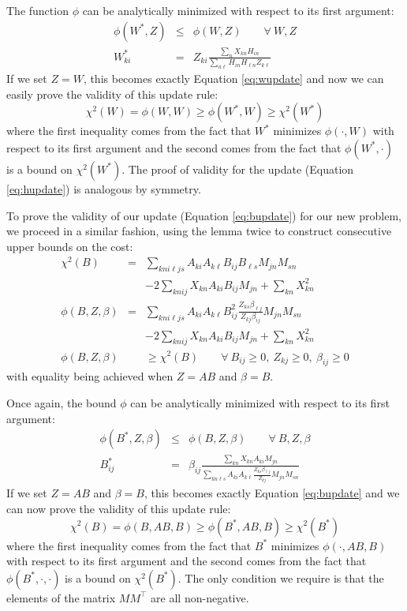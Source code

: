 \documentclass[12pt,preprint]{aastex}
\newcommand{\T}{^{\scriptscriptstyle \top}}
\newcommand{\Xkn}{X_{kn}}
\renewcommand{\AA}{A}
\newcommand{\WW}{W}
\newcommand{\Wki}{W_{ki}}
\newcommand{\Hin}{H_{in}}
\newcommand{\Hln}{H_{\ell{}n}}
\newcommand{\BB}{B}
\newcommand{\MM}{M}
\newcommand{\Aki}{A_{ki}}
\newcommand{\Akl}{A_{k\ell}}
\newcommand{\Bij}{B_{ij}}
\newcommand{\Bls}{B_{\ell{}s}}
\newcommand{\Mjn}{M_{jn}}
\newcommand{\Msn}{M_{sn}}
\newcommand{\ZZ}{Z}
\newcommand{\Zki}{Z_{ki}}
\newcommand{\Zkl}{Z_{k\ell}}
\newcommand{\Zkj}{Z_{kj}}
\newcommand{\Zks}{Z_{ks}}
\newcommand{\betaij}{\beta_{ij}}
\newcommand{\betalj}{\beta_{\ell{}j}}
\begin{document}
The function $\phi$ can be analytically minimized with respect to
its first argument:
\begin{eqnarray}
\phi(\WW^*,\ZZ) &\leq& \phi(\WW,\ZZ) \qquad \forall \: \WW,\ZZ \\
\Wki^* &=& \Zki \frac{\sum_n \Xkn \Hin}{\sum_{n\ell} \Hin\Hln \Zkl}
\end{eqnarray}
If we set $\ZZ=\WW$, this becomes exactly Equation \ref{eq:wupdate} and
now we can easily prove the validity of this update rule: 
\begin{equation}
\chi^2(\WW) = \phi(\WW,\WW) \geq \phi(\WW^*,\WW) \geq \chi^2(\WW^*)
\end{equation}
where the first inequality comes from the fact that $\WW^*$ minimizes
$\phi(\cdot,\WW)$ with respect to its first argument
and the second comes from the fact that $\phi(\WW^*,\cdot)$ is a bound
on $\chi^2(\WW^*)$. The proof of validity for the update
(Equation \ref{eq:hupdate}) is analogous by symmetry. 

To prove the validity of our update (Equation \ref{eq:bupdate}) for
our new problem, we proceed in a similar fashion, using the lemma
twice to construct consecutive upper bounds on the cost: {\small
\begin{eqnarray} 
\chi^2(\BB) &=& \sum_{kni\ell{}js} \Aki\Akl\Bij\Bls\Mjn\Msn\\ \nonumber
&&- 2 \sum_{knij} \Xkn\Aki\Bij\Mjn + \sum_{kn} \Xkn^2 \\
\phi(\BB,\ZZ,\beta) &=& \sum_{kni\ell{}js} \Aki\Akl\Bij^2
\frac{\Zks\betalj}{\Zkj\betaij}\Mjn\Msn\\ \nonumber
&&- 2 \sum_{knij} \Xkn\Aki\Bij\Mjn + \sum_{kn} \Xkn^2 \\
\phi(\BB,\ZZ,\beta) &&\geq \chi^2(\BB) \qquad \forall 
\: \Bij\geq 0,\: \Zkj\geq 0,\: \betaij\geq 0
\end{eqnarray}
} with equality being achieved when $\ZZ=\AA\BB$ and 
$\beta=\BB$.

Once again, the bound $\phi$ can be analytically minimized with respect to
its first argument:
\begin{eqnarray}
\phi(\BB^*,\ZZ,\beta) &\leq& \phi(\BB,\ZZ,\beta) \qquad 
\forall \: \BB,\ZZ,\beta \\
\Bij^* &=& \betaij \frac{\sum_{kn} \Xkn\Aki\Mjn}
{\sum_{kn\ell{}s} \Aki\Akl\frac{\Zks\betalj}{\Zkj}\Mjn\Msn}
\end{eqnarray}
If we set $\ZZ=\AA\BB$ and $\beta=\BB$, this becomes
exactly Equation \ref{eq:bupdate} and 
we can now prove the validity of this update rule: 
\begin{equation}
\chi^2(\BB) = \phi(\BB,\AA\BB,\BB) \geq \phi(\BB^*,\AA\BB,\BB) 
\geq \chi^2(\BB^*) 
\end{equation}
where the first inequality comes from the fact that $\BB^*$ minimizes
$\phi(\cdot,\AA\BB,\BB)$ with respect to its first argument
and the second comes from the fact that $\phi(\BB^*,\cdot,\cdot)$ is a bound
on $\chi^2(\BB^*)$. The only condition we require is that the elements
of the matrix $\MM\MM\T$ are all non-negative.
\end{document}
